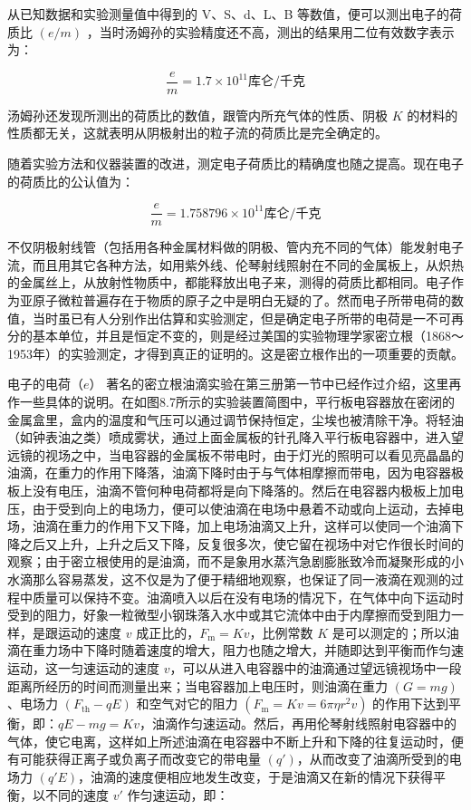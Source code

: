 从已知数据和实验测量值中得到的 V、S、d、L、B
等数值，便可以测出电子的荷质比 \((e/m)\)
，当时汤姆孙的实验精度还不高，测出的结果用二位有效数字表示为：

\[
\frac {e}{m} = 1.7 \times 10 ^ {11} \text{库仑/千克}
\]

汤姆孙还发现所测出的荷质比的数值，跟管内所充气体的性质、阴极 \(K\)
的材料的性质都无关，这就表明从阴极射出的粒子流的荷质比是完全确定的。

随着实验方法和仪器装置的改进，测定电子荷质比的精确度也随之提高。现在电子的荷质比的公认值为：

\[
\frac {e}{m} = 1.758796 \times 10 ^ {11} \text{库仑/千克}
\]

不仅阴极射线管（包括用各种金属材料做的阴极、管内充不同的气体）能发射电子流，而且用其它各种方法，如用紫外线、伦琴射线照射在不同的金属板上，从炽热的金属丝上，从放射性物质中，都能释放出电子来，测得的荷质比都相同。电子作为亚原子微粒普遍存在于物质的原子之中是明白无疑的了。然而电子所带电荷的数值，当时虽已有人分别作出估算和实验测定，但是确定电子所带的电荷是一不可再分的基本单位，并且是恒定不变的，则是经过美国的实验物理学家密立根（1868～1953年）的实验测定，才得到真正的证明的。这是密立根作出的一项重要的贡献。

电子的电荷（\(e\)）
著名的密立根油滴实验在第三册第一节中已经作过介绍，这里再作一些具体的说明。在如图8.7所示的实验装置简图中，平行板电容器放在密闭的金属盒里，盒内的温度和气压可以通过调节保持恒定，尘埃也被清除干净。将轻油（如钟表油之类）喷成雾状，通过上面金属板的针孔降入平行板电容器中，进入望远镜的视场之中，当电容器的金属板不带电时，由于灯光的照明可以看见亮晶晶的油滴，在重力的作用下降落，油滴下降时由于与气体相摩擦而带电，因为电容器极板上没有电压，油滴不管何种电荷都将是向下降落的。然后在电容器内极板上加电压，由于受到向上的电场力，便可以使油滴在电场中悬着不动或向上运动，去掉电场，油滴在重力的作用下又下降，加上电场油滴又上升，这样可以使同一个油滴下降之后又上升，上升之后又下降，反复很多次，使它留在视场中对它作很长时间的观察；由于密立根使用的是油滴，而不是象用水蒸汽急剧膨胀致冷而凝聚形成的小水滴那么容易蒸发，这不仅是为了便于精细地观察，也保证了同一液滴在观测的过程中质量可以保持不变。油滴喷入以后在没有电场的情况下，在气体中向下运动时受到的阻力，好象一粒微型小钢珠落入水中或其它流体中由于内摩擦而受到阻力一样，是跟运动的速度
\(v\) 成正比的，\(F_{\mathrm{m}} = Kv\)，比例常数 \(K\)
是可以测定的；所以油滴在重力场中下降时随着速度的增大，阻力也随之增大，并随即达到平衡而作匀速运动，这一匀速运动的速度
\(v\)，可以从进入电容器中的油滴通过望远镜视场中一段距离所经历的时间而测量出来；当电容器加上电压时，则油滴在重力
\((G = mg)\)、电场力 \((F_{\mathrm{th}} - qE)\) 和空气对它的阻力
\((F_{\mathrm{m}} = Kv = 6\pi \eta r^2 v)\)
的作用下达到平衡，即：\(qE - mg = Kv\)，油滴作匀速运动。然后，再用伦琴射线照射电容器中的气体，使它电离，这样如上所述油滴在电容器中不断上升和下降的往复运动时，便有可能获得正离子或负离子而改变它的带电量
\((q')\)，从而改变了油滴所受到的电场力
\((q'E)\)，油滴的速度便相应地发生改变，于是油滴又在新的情况下获得平衡，以不同的速度
\(v'\) 作匀速运动，即：

